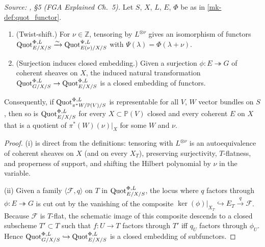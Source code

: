 \begin{lemma}
  \label{mk-lem:quot_reduction_to_pi_star_W}

  \textit{Source: \cite{nitsure-hilbert-quot}, \S 5 (FGA Explained Ch.~5).}
  Let \(S\), \(X\), \(L\), \(E\), \(\Phi\) be as in \ref{mk-def:quot_functor}.
  \begin{enumerate}
    \item (Twist-shift.) For \(\nu \in \mathbb{Z}\), tensoring by
      \(L^{\otimes \nu}\) gives an isomorphism of functors
      \(\operatorname{Quot}^{\Phi,L}_{E/X/S} \xrightarrow{\sim}
      \operatorname{Quot}^{\Psi,L}_{E(\nu)/X/S}\) with \(\Psi(\lambda) = \Phi(\lambda + \nu)\).
    \item (Surjection induces closed embedding.) Given a surjection
      \(\phi : E \twoheadrightarrow G\) of coherent sheaves on \(X\), the
      induced natural transformation
      \(\operatorname{Quot}^{\Phi,L}_{G/X/S} \to \operatorname{Quot}^{\Phi,L}_{E/X/S}\) is a closed
      embedding of functors.
  \end{enumerate}
  Consequently, if \(\operatorname{Quot}^{\Phi,L}_{\pi^* W / \mathbb{P}(V)/S}\) is
  representable for all \(V\), \(W\) vector bundles on \(S\), then so is
  \(\operatorname{Quot}^{\Phi,L}_{E/X/S}\) for every \(X \subset \mathbb{P}(V)\) closed and
  every coherent \(E\) on \(X\) that is a quotient of \(\pi^*(W)(\nu)|_X\) for
  some \(W\) and \(\nu\).
\end{lemma}
\begin{proof}

  (i) is direct from the definitions: tensoring with \(L^{\otimes \nu}\) is
  an autoequivalence of coherent sheaves on \(X\) (and on every \(X_T\)),
  preserving surjectivity, \(T\)-flatness, and properness of support, and
  shifting the Hilbert polynomial by \(\nu\) in the variable.

  (ii) Given a family \(\langle \mathcal{F}, q\rangle\) on \(T\) in
  \(\operatorname{Quot}^{\Phi,L}_{E/X/S}\), the locus where \(q\) factors through
  \(\phi : E \twoheadrightarrow G\) is cut out by the vanishing of the
  composite \(\ker(\phi)|_{X_T} \hookrightarrow E_T \xrightarrow{q}
  \mathcal{F}\). Because \(\mathcal{F}\) is \(T\)-flat, the schematic image of
  this composite descends to a closed subscheme \(T' \subset T\) such that
  \(f : U \to T\) factors through \(T'\) iff \(q_U\) factors through \(\phi_U\).
  Hence \(\operatorname{Quot}^{\Phi,L}_{G/X/S} \hookrightarrow \operatorname{Quot}^{\Phi,L}_{E/X/S}\)
  is a closed embedding of subfunctors.
\end{proof}

